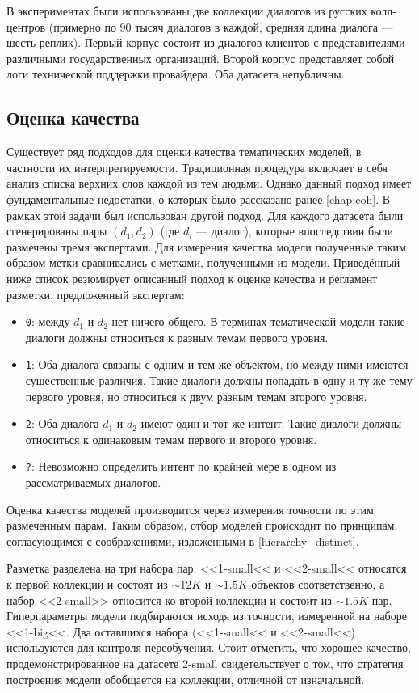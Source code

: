 В экспериментах были использованы две коллекции диалогов из русских колл-центров (примерно по 90 тысяч диалогов в каждой, средняя длина диалога --- шесть реплик). Первый корпус состоит из диалогов клиентов с представителями различными государственных организаций. Второй корпус представляет собой логи технической поддержки провайдера. Оба датасета непубличны.

\subsection{Оценка качества}

Существует ряд подходов для оценки качества тематических моделей, в частности их интерпретируемости. Традиционная процедура включает в себя анализ списка верхних слов каждой из тем людьми. Однако данный подход имеет фундаментальные недостатки, о которых было рассказано ранее \ref{chap:coh}. В рамках этой задачи был использован другой подход.
Для каждого датасета были сгенерированы пары $(d_1, d_2)$ (где $d_i$ --- диалог), которые впоследствии были размечены тремя экспертами. Для измерения качества модели полученные таким образом метки сравнивались с метками, полученными из модели.
Приведённый ниже список резюмирует описанный подход к оценке качества и регламент разметки, предложенный экспертам:
\begin{itemize}
    \item \texttt{0}: между $d_1$ и $d_2$ нет ничего общего. В терминах тематической модели такие диалоги должны относиться к разным темам первого уровня.
    \item \texttt{1}: Оба диалога связаны с одним и тем же объектом, но между ними имеются существенные различия. Такие диалоги должны попадать в одну и ту же тему первого уровня, но относиться к двум разным темам второго уровня.
    \item \texttt{2}: Оба диалога $d_1$ и $d_2$ имеют один и тот же интент. Такие диалоги должны относиться к одинаковым темам первого и второго уровня.
    \item \texttt{?}: Невозможно определить интент по крайней мере в одном из рассматриваемых диалогов.
\end{itemize}

Оценка качества моделей производится через измерения точности по этим размеченным парам. Таким образом, отбор моделей происходит по принципам, согласующимся с соображениями, изложенными в \ref{hierarchy_distinct}.

Разметка разделена на три набора пар: <<1-small<< и <<2-small<< относятся к первой коллекции и состоят из $\sim\!12K$ и $\sim1.5K$ объектов соответственно, а набор <<2-small>> относится ко второй коллекции и состоит из $\sim\!1.5K$ пар. Гиперпараметры модели подбираются исходя из точности, измеренной на  наборе <<1-big<<. Два оставшихся набора (<<1-small<< и <<2-small<<) используются для контроля переобучения. Стоит отметить, что хорошее качество, продемонстрированное на датасете 2-small свидетельствует о том, что стратегия построения модели обобщается на коллекции, отличной от изначальной.



